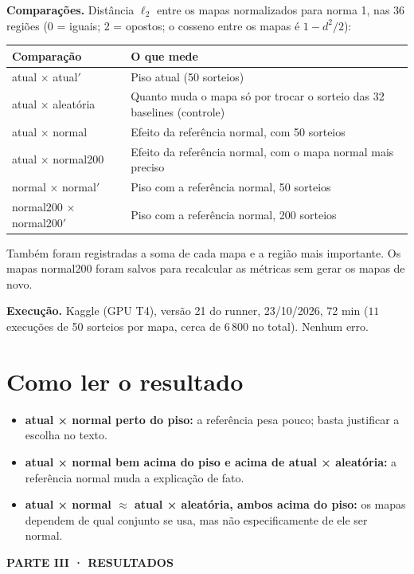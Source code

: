 \documentclass[11pt,a4paper]{article}
\newcommand{\partbar}[1]{\par\vspace{1.2em}\noindent\colorbox{black!80}{\parbox{\dimexpr\linewidth-2\fboxsep}{\color{white}\bfseries\sffamily\MakeUppercase{#1}}}\par\vspace{0.4em}}
\begin{document}
\textbf{Comparações.} Distância $\ell_2$ entre os mapas normalizados para norma 1, nas 36 regiões (0 = iguais; 2 = opostos; o cosseno entre os mapas é $1 - d^2/2$):
\begin{center}\small
\begin{tabularx}{\linewidth}{lX}
\toprule
\textbf{Comparação} & \textbf{O que mede} \\
\midrule
atual × atual$'$ & Piso atual (50 sorteios) \\
atual × aleatória & Quanto muda o mapa só por trocar o sorteio das 32 baselines (controle) \\
atual × normal & Efeito da referência normal, com 50 sorteios \\
atual × normal200 & Efeito da referência normal, com o mapa normal mais preciso \\
normal × normal$'$ & Piso com a referência normal, 50 sorteios \\
normal200 × normal200$'$ & Piso com a referência normal, 200 sorteios \\
\bottomrule
\end{tabularx}
\end{center}
Também foram registradas a soma de cada mapa e a região mais importante. Os mapas normal200 foram salvos para recalcular as métricas sem gerar os mapas de novo.

\textbf{Execução.} Kaggle (GPU T4), versão 21 do runner, 23/10/2026, 72 min ($11$ execuções de 50 sorteios por mapa, cerca de 6\,800 no total). Nenhum erro.

\section{Como ler o resultado}
\begin{itemize}
\item \textbf{atual × normal perto do piso:} a referência pesa pouco; basta justificar a escolha no texto.
\item \textbf{atual × normal bem acima do piso e acima de atual × aleatória:} a referência normal muda a explicação de fato.
\item \textbf{atual × normal $\approx$ atual × aleatória, ambos acima do piso:} os mapas dependem de qual conjunto se usa, mas não especificamente de ele ser normal.
\end{itemize}

\partbar{Parte III · Resultados}
\end{document}
